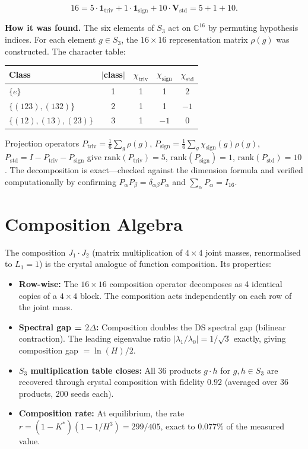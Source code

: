 \documentclass[11pt,a4paper]{article}
\theoremstyle{definition}
\theoremstyle{remark}
\newcommand{\C}{\mathbb{C}}
\begin{document}
\begin{equation}
16 = 5 \cdot \mathbf{1}_{\mathrm{triv}} + 1 \cdot \mathbf{1}_{\mathrm{sign}} + 10 \cdot \mathbf{V}_{\mathrm{std}} = 5 + 1 + 10.
\end{equation}

\textbf{How it was found.} The six elements of $S_3$ act on $\C^{16}$ by permuting hypothesis indices. For each element $g \in S_3$, the $16 \times 16$ representation matrix $\rho(g)$ was constructed. The character table:

\begin{center}
\begin{tabular}{lcccc}
\toprule
Class & $|$class$|$ & $\chi_{\mathrm{triv}}$ & $\chi_{\mathrm{sign}}$ & $\chi_{\mathrm{std}}$ \\
\midrule
$\{e\}$ & 1 & 1 & 1 & 2 \\
$\{(123),(132)\}$ & 2 & 1 & 1 & $-1$ \\
$\{(12),(13),(23)\}$ & 3 & 1 & $-1$ & 0 \\
\bottomrule
\end{tabular}
\end{center}

Projection operators $P_{\mathrm{triv}} = \frac{1}{6}\sum_g \rho(g)$, $P_{\mathrm{sign}} = \frac{1}{6}\sum_g \chi_{\mathrm{sign}}(g)\rho(g)$, $P_{\mathrm{std}} = I - P_{\mathrm{triv}} - P_{\mathrm{sign}}$ give $\mathrm{rank}(P_{\mathrm{triv}}) = 5$, $\mathrm{rank}(P_{\mathrm{sign}}) = 1$, $\mathrm{rank}(P_{\mathrm{std}}) = 10$. The decomposition is exact---checked against the dimension formula and verified computationally by confirming $P_\alpha P_\beta = \delta_{\alpha\beta} P_\alpha$ and $\sum_\alpha P_\alpha = I_{16}$.


\section{Composition Algebra}\label{sec:composition}

The composition $J_1 \cdot J_2$ (matrix multiplication of $4\times 4$ joint masses, renormalised to $L_1 = 1$) is the crystal analogue of function composition. Its properties:

\begin{itemize}[nosep]
\item \textbf{Row-wise:} The $16 \times 16$ composition operator decomposes as 4 identical copies of a $4 \times 4$ block. The composition acts independently on each row of the joint mass.
\item \textbf{Spectral gap = $2\Delta$:} Composition doubles the DS spectral gap (bilinear contraction). The leading eigenvalue ratio $|\lambda_1/\lambda_0| = 1/\sqrt{3}$ exactly, giving composition gap $= \ln(H)/2$.
\item \textbf{$S_3$ multiplication table closes:} All 36 products $g \cdot h$ for $g, h \in S_3$ are recovered through crystal composition with fidelity $0.92$ (averaged over 36 products, 200 seeds each).
\item \textbf{Composition rate:} At equilibrium, the rate $r = (1-K^*)(1-1/H^3) = 299/405$, exact to $0.077\%$ of the measured value.
\end{itemize}
\end{document}
